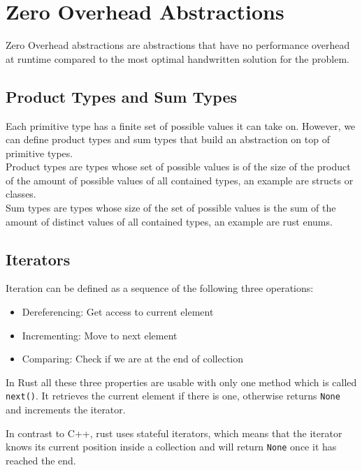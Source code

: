     \section{Zero Overhead Abstractions}

    Zero Overhead abstractions are abstractions that have no performance overhead at runtime compared to the most optimal handwritten solution for the problem.

    \subsection{Product Types and Sum Types}

    Each primitive type has a finite set of possible values it can take on. However, we can define product types and sum types that build an abstraction on top of primitive types.\\
    Product types are types whose set of possible values is of the size of the product of the amount of possible values of all contained types, an example are structs or classes.\\
    Sum types are types whose size of the set of possible values is the sum of the amount of distinct values of all contained types, an example are rust enums.

    \subsection{Iterators}

    Iteration can be defined as a sequence of the following three operations:

    \begin{itemize}
        \item Dereferencing: Get access to current element
        \item Incrementing: Move to next element
        \item Comparing: Check if we are at the end of collection
    \end{itemize}

    In Rust all these three properties are usable with only one method which is called \lstinline{next()}. It retrieves the current element if there is one, otherwise returns \lstinline{None} and increments the iterator.

    In contrast to C++, rust uses stateful iterators, which means that the iterator knows its current position inside a collection and will return \lstinline{None} once it has reached the end.

